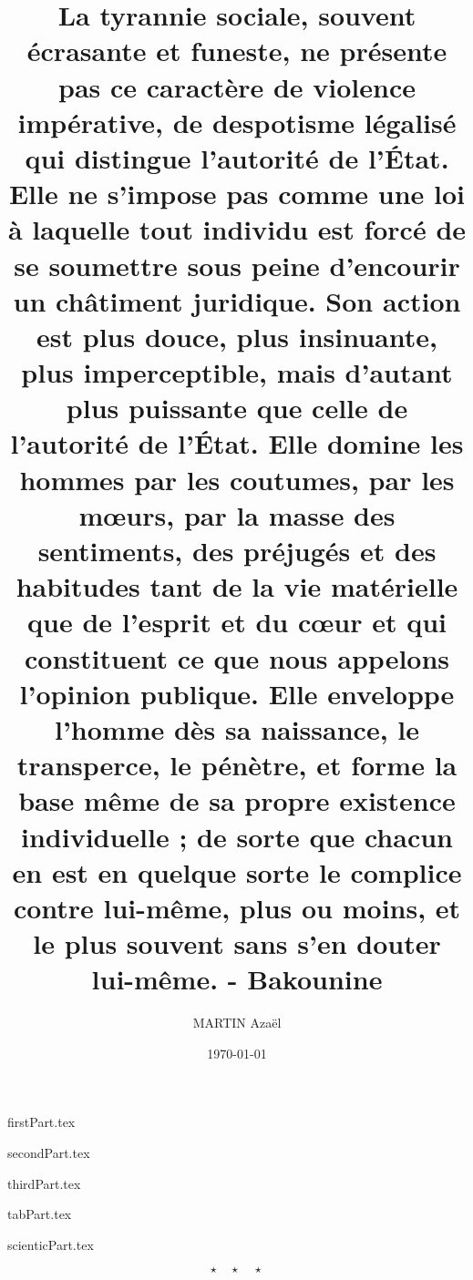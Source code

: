 \documentclass{rUTT}
\title{
La tyrannie sociale, souvent écrasante et funeste, ne présente pas ce caractère de violence
impérative, de despotisme légalisé qui distingue l’autorité de l’État. Elle ne s’impose pas
comme une loi à laquelle tout individu est forcé de se soumettre sous peine d’encourir un
châtiment juridique. Son action est plus douce, plus insinuante, plus imperceptible, mais
d’autant plus puissante que celle de l’autorité de l’État. Elle domine les hommes par les
coutumes, par les mœurs, par la masse des sentiments, des préjugés et des habitudes tant de la
vie matérielle que de l’esprit et du cœur et qui constituent ce que nous appelons l’opinion
publique. Elle enveloppe l’homme dès sa naissance, le transperce, le pénètre, et forme la base
même de sa propre existence individuelle ; de sorte que chacun en est en quelque sorte le
complice contre lui-même, plus ou moins, et le plus souvent sans s’en douter lui-même. - Bakounine
}
\date{\today}
\author{
    {\sc MARTIN} Azaël
    }
\begin{document}

    \frontpageST %

    \listoffigures
    \listoftables

    \clearpage

    \justifying

    {firstPart.tex}

    \clearpage

    {secondPart.tex}

    \clearpage

    {thirdPart.tex}

    \clearpage

    {tabPart.tex}

    \clearpage

    {scienticPart.tex}


    \medskip %

    \[ \star \quad \star \quad \star \]

    \nocite{*} %

    {
    \RaggedRight %
    \sloppy
    \printbibliography[title={Bibliographie}]
    }
\end{document}
